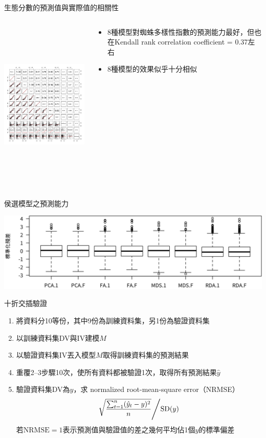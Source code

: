 \documentclass[10pt, aspectratio=1610, xcolor=table]{beamer}
\begin{document}
\begin{frame}{生態分數的預測值與實際值的相關性}
\begin{columns}[onlytextwidth, c]
	\begin{column}{0.55\textwidth}
		\includegraphics[trim=100 100 100 100, height=8cm]{all.png}
	\end{column}
	\begin{column}{0.45\textwidth}
		\begin{itemize}
			\item 8種模型對蜘蛛多樣性指數的預測能力最好，但也在Kendall rank correlation coefficient = 0.37左右
			\item 8種模型的效果似乎十分相似
		\end{itemize}
	\end{column}
\end{columns}
\end{frame}


\begin{frame}{侯選模型之預測能力}

\includegraphics[width=1\textwidth]{resid最佳迴歸法.png}
\end{frame}


\begin{frame}{十折交插驗證}
\begin{enumerate}
	\item 將資料分10等份，其中9份為\alert{訓練資料集}，另1份為\alert{驗證資料集}
	\item 以訓練資料集DV與IV建模$M$
	\item 以驗證資料集IV丟入模型$M$取得訓練資料集的預測結果
	\item 重覆2--3步驟10次，使所有資料都被驗證1次，取得所有預測結果$\hat{y}$
	\item 驗證資料集DV為$y$，求 normalized root-mean-square error（NRMSE）
		\[ \left. \sqrt{\frac{\sum_{t=1}^n (\hat y_t - y)^2}{n}} \middle/ \mathrm{SD}(y) \right. \]
	若$\mathrm{NRMSE} = 1$表示預測值與驗證值的差之幾何平均佔1個$y$的標準偏差
\end{enumerate}
\end{frame}
\end{document}
